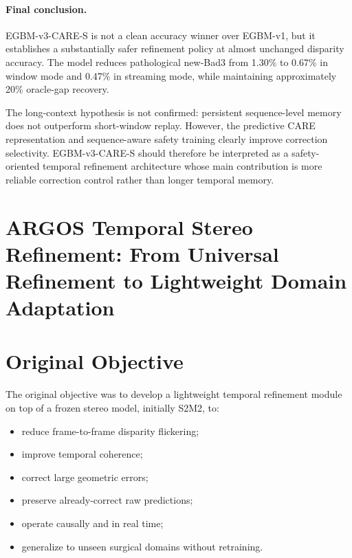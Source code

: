 \documentclass[11pt,a4paper]{article}
\newcommand{\smodel}{S2M2}
\begin{document}
\paragraph{Final conclusion.}
EGBM-v3-CARE-S is not a clean accuracy winner over EGBM-v1, but it establishes a
substantially safer refinement policy at almost unchanged disparity accuracy.
The model reduces pathological new-Bad3 from 1.30\% to 0.67\% in window mode and
0.47\% in streaming mode, while maintaining approximately 20\% oracle-gap
recovery.

The long-context hypothesis is not confirmed: persistent sequence-level memory
does not outperform short-window replay. However, the predictive CARE
representation and sequence-aware safety training clearly improve correction
selectivity. EGBM-v3-CARE-S should therefore be interpreted as a safety-oriented
temporal refinement architecture whose main contribution is more reliable
correction control rather than longer temporal memory.

\renewcommand{\thesection}{\arabic{section}}
\setcounter{section}{0}

\section*{ARGOS Temporal Stereo Refinement: From Universal Refinement to
Lightweight Domain Adaptation}



\section{Original Objective}

The original objective was to develop a lightweight temporal refinement module on
top of a frozen stereo model, initially \smodel, to:

\begin{itemize}[leftmargin=*]
    \item reduce frame-to-frame disparity flickering;
    \item improve temporal coherence;
    \item correct large geometric errors;
    \item preserve already-correct raw predictions;
    \item operate causally and in real time;
    \item generalize to unseen surgical domains without retraining.
\end{itemize}
\end{document}
